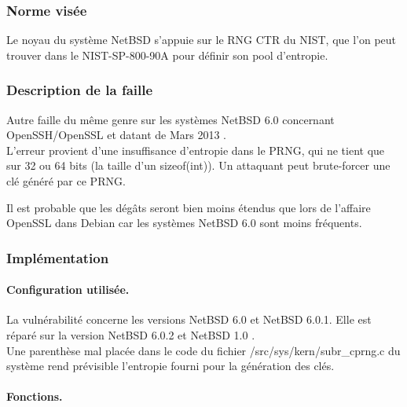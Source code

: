 		\subsubsection{Norme visée}
		
			Le noyau du système NetBSD s'appuie sur le RNG CTR du NIST, que
			l'on peut trouver dans le NIST-SP-800-90A \cite{nist800-90A} pour
			définir son pool d'entropie.	
		
		\subsubsection{Description de la faille}
		
			Autre faille du même genre sur les systèmes NetBSD 6.0 
			concernant OpenSSH/OpenSSL et datant de Mars 2013
			\cite{alerteBSD2013} \cite{failleNetBSDPatrick}. \\
		
			L'erreur provient d'une insuffisance d'entropie dans le PRNG,
			qui ne tient que sur 32 ou 64 bits (la taille d'un sizeof(int)).
			Un attaquant peut brute-forcer une clé généré par ce PRNG.
		
			Il est probable que les dégâts seront bien moins étendus que 
			lors de l'affaire OpenSSL dans Debian car les systèmes 
			NetBSD 6.0 sont moins fréquents.\\
			
		\subsubsection{Implémentation}
			
			\paragraph{Configuration utilisée.\\} 
			
			La vulnérabilité concerne les versions NetBSD 6.0 et NetBSD 6.0.1.
			Elle est réparé sur la version NetBSD 6.0.2 et NetBSD 1.0 
			\cite{diffNetBSD}.\\
			
			Une parenthèse mal placée dans le code du fichier 
			/src/sys/kern/subr\_cprng.c du système rend prévisible l'entropie
			fourni pour la génération des clés.\\
			
			\paragraph{Fonctions.\\} 
			
